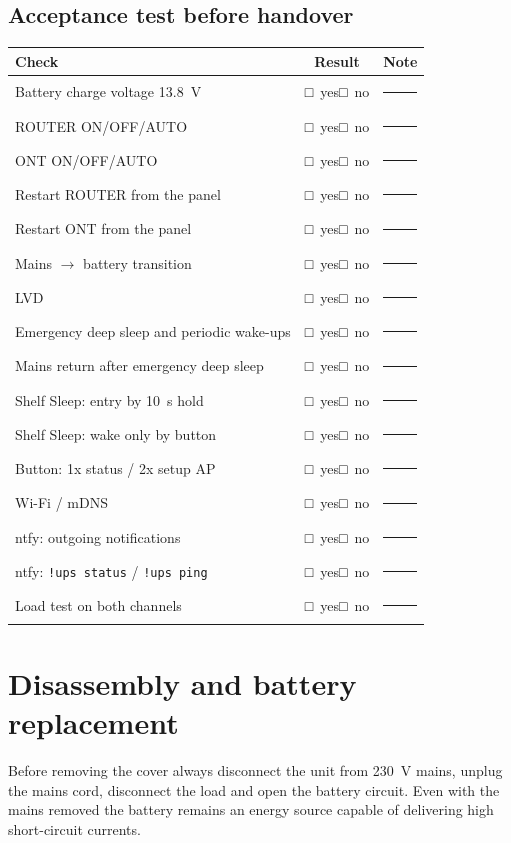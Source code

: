 \documentclass[11pt,a4paper]{article}
\newcommand{\yesno}{□~yes\quad □~no}
\begin{document}
\subsection{Acceptance test before handover}
\begin{tabularx}{\textwidth}{@{}XcX@{}}
\toprule
\textbf{Check} & \textbf{Result} & \textbf{Note} \\
\midrule
Battery charge voltage 13.8~V & \yesno & \rule{40mm}{0.4pt} \\
ROUTER ON/OFF/AUTO & \yesno & \rule{40mm}{0.4pt} \\
ONT ON/OFF/AUTO & \yesno & \rule{40mm}{0.4pt} \\
Restart ROUTER from the panel & \yesno & \rule{40mm}{0.4pt} \\
Restart ONT from the panel & \yesno & \rule{40mm}{0.4pt} \\
Mains $\rightarrow$ battery transition & \yesno & \rule{40mm}{0.4pt} \\
LVD & \yesno & \rule{40mm}{0.4pt} \\
Emergency deep sleep and periodic wake-ups & \yesno & \rule{40mm}{0.4pt} \\
Mains return after emergency deep sleep & \yesno & \rule{40mm}{0.4pt} \\
Shelf Sleep: entry by 10~s hold & \yesno & \rule{40mm}{0.4pt} \\
Shelf Sleep: wake only by button & \yesno & \rule{40mm}{0.4pt} \\
Button: 1x status / 2x setup AP & \yesno & \rule{40mm}{0.4pt} \\
Wi-Fi / mDNS & \yesno & \rule{40mm}{0.4pt} \\
ntfy: outgoing notifications & \yesno & \rule{40mm}{0.4pt} \\
ntfy: \texttt{!ups status} / \texttt{!ups ping} & \yesno & \rule{40mm}{0.4pt} \\
Load test on both channels & \yesno & \rule{40mm}{0.4pt} \\
\bottomrule
\end{tabularx}

\section{Disassembly and battery replacement}

\begin{tcolorbox}[colback=lightwarn,colframe=warn,title=Hazardous voltage]
Before removing the cover always disconnect the unit from 230~V mains, unplug the mains cord, disconnect the load and open the battery circuit. Even with the mains removed the battery remains an energy source capable of delivering high short-circuit currents.
\end{tcolorbox}
\end{document}
